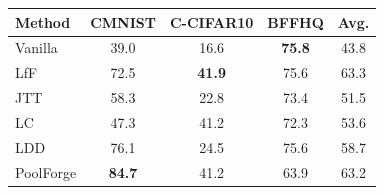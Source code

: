 \begin{tabular}{lcccc}
\toprule
Method & CMNIST & C-CIFAR10 & BFFHQ & Avg. \\
\midrule
Vanilla & 39.0 & 16.6 & \textbf{75.8} & 43.8 \\
LfF & 72.5 & \textbf{41.9} & 75.6 & 63.3 \\
JTT & 58.3 & 22.8 & 73.4 & 51.5 \\
LC & 47.3 & 41.2 & 72.3 & 53.6 \\
LDD & 76.1 & 24.5 & 75.6 & 58.7 \\
\rowcolor{ours}PoolForge & \textbf{84.7} & 41.2 & 63.9 & 63.2 \\
\bottomrule
\end{tabular}
